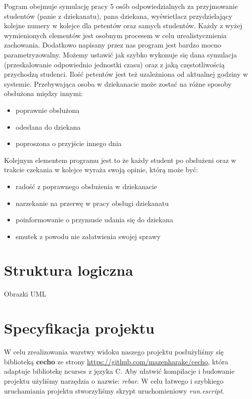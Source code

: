 \documentclass[a4paper,12pt]{article}
\begin{document}
 Pogram obejmuje symulację pracy 5 osób odpowiedzialnych za przyjmowanie studentów (panie z dziekanatu), pana dziekana, wyświetlacz przydzielający kolejne numery w kolejce dla petentów oraz samych studentów.
 Każdy z wyżej wymienionych elementów jest osobnym procesem w celu urealistycznienia zachowania.
 Dodatkowo napisany przez nas program jest bardzo mocno parametryzowalny.  Możemy ustawić jak szybko wykonuje się dana symulacja (przeskalowanie odpowiednio jednostki czasu) oraz z jaką częstotliwością przychodzą studenci. Ilość petentów jest też uzależniona od aktualnej godziny w systemie. Przebywająca osoba w dziekanacie może zostać na różne sposoby obsłużona między innymi:
 
 \begin{itemize}
 	\item poprawnie obsłużona
 	\item odesłana do dziekana
 	\item poproszona o przyjście innego dnia
 \end{itemize}
 
Kolejnym elementem programu jest to że każdy student po obsłużeni oraz w trakcie czekania w kolejce wyraża swoją opinie, którą może być:
 \begin{itemize}
	\item radość z poprawnego obsłużenia w dziekanacie
	\item narzekanie na przerwę w pracy obsługi dziekanatu
	\item poinformowanie o przymusie udania się do dziekana
	\item smutek z powodu nie załatwienia swojej sprawy
\end{itemize}

\section{Struktura logiczna}
Obrazki UML %

\section{Specyfikacja projektu}
	W celu zrealizowania warstwy widoku naszego projektu posłużyliśmy się biblioteką \nobreak \textbf{cecho} ze strony \url{https://github.com/mazenharake/cecho}, która adaptuje bibliotekę ncurses z języka C. 
	Aby ułatwić kompilacje i budowanie projektu użyliśmy narzędzia o nazwie: \textit{rebar}.
	W celu łatwego i szybkiego uruchamiania projektu stworzyliśmy skrypt uruchomieniowy \textit{run.escript}.
	
\end{document}
